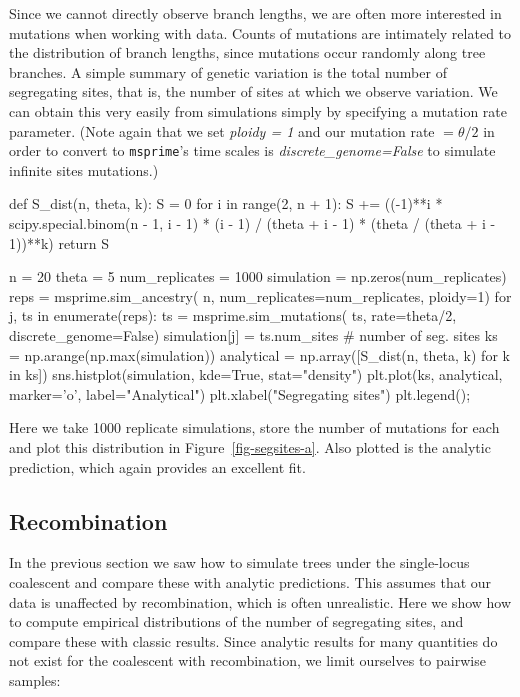 \documentclass[graybox]{svmult}
\newcommand{\msprime}[0]{\texttt{msprime}}
\begin{document}
Since we cannot directly observe branch lengths, we are often more
interested in mutations when working with data. Counts of mutations are
intimately related to the distribution of branch lengths, since
mutations occur randomly along tree branches. A simple summary
of genetic variation is the total number of segregating sites, that is, the number of
sites at which we observe variation. We can obtain this very
easily from simulations simply by specifying a mutation rate parameter.
(Note again that we set \emph{ploidy = 1} and our mutation rate
\(= \theta / 2\) in order to convert to \msprime's time scales
is \emph{discrete\_genome=False} to simulate infinite sites
mutations.)

\begin{pythoncode}
def S_dist(n, theta, k):
    S = 0
    for i in range(2, n + 1):
        S += ((-1)**i * scipy.special.binom(n - 1, i - 1)
            * (i - 1) / (theta + i - 1)
            * (theta / (theta + i - 1))**k)
    return S

n = 20
theta = 5
num_replicates = 1000
simulation = np.zeros(num_replicates)
reps = msprime.sim_ancestry(
    n, num_replicates=num_replicates, ploidy=1)
for j, ts in enumerate(reps):
    ts = msprime.sim_mutations(
        ts, rate=theta/2, discrete_genome=False)
    simulation[j] = ts.num_sites  # number of seg. sites
ks = np.arange(np.max(simulation))
analytical = np.array([S_dist(n, theta, k) for k in ks])
sns.histplot(simulation, kde=True, stat="density")
plt.plot(ks, analytical, marker='o', label="Analytical")
plt.xlabel("Segregating sites")
plt.legend();
\end{pythoncode}


Here we take 1000 replicate simulations, store the number of mutations for each and plot this distribution in
Figure~\ref{fig-segsites-a}. Also plotted is the analytic prediction, which again provides an excellent fit.


\subsection{Recombination}

In the previous section we saw how to simulate trees
under the single-locus coalescent and compare these
with analytic predictions. This assumes that our data is unaffected
by recombination, which is often unrealistic. Here we show how to
compute empirical distributions of the number of segregating sites, and compare
these with classic results. Since analytic
results for many quantities do not exist for the coalescent with recombination, we limit ourselves to pairwise samples:
\end{document}
